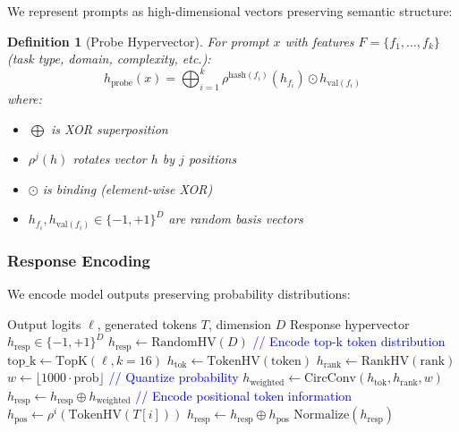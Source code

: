 \documentclass[11pt,a4paper]{article}
\newtheorem{definition}{Definition}
\begin{document}
We represent prompts as high-dimensional vectors preserving semantic structure:

\begin{definition}[Probe Hypervector]
For prompt $x$ with features $F = \{f_1, \ldots, f_k\}$ (task type, domain, complexity, etc.):
\begin{equation}
h_{\text{probe}}(x) = \bigoplus_{i=1}^k \rho^{\text{hash}(f_i)}(h_{f_i}) \odot h_{\text{val}(f_i)}
\end{equation}
where:
\begin{itemize}
\item $\bigoplus$ is XOR superposition
\item $\rho^j(h)$ rotates vector $h$ by $j$ positions
\item $\odot$ is binding (element-wise XOR)
\item $h_{f_i}, h_{\text{val}(f_i)} \in \{-1,+1\}^D$ are random basis vectors
\end{itemize}
\end{definition}

\subsubsection{Response Encoding}

We encode model outputs preserving probability distributions:

\begin{algorithm}
\caption{Response to Hypervector}
\label{alg:response-hv}
\begin{algorithmic}[1]
\Require Output logits $\ell$, generated tokens $T$, dimension $D$
\Ensure Response hypervector $h_{\text{resp}} \in \{-1,+1\}^D$
\State $h_{\text{resp}} \gets \text{RandomHV}(D)$
\State \textcolor{blue}{// Encode top-k token distribution}
\State $\text{top\_k} \gets \text{TopK}(\ell, k=16)$
    \State $h_{\text{tok}} \gets \text{TokenHV}(\text{token})$
    \State $h_{\text{rank}} \gets \text{RankHV}(\text{rank})$
    \State $w \gets \lfloor 1000 \cdot \text{prob} \rfloor$ \textcolor{blue}{// Quantize probability}
    \State $h_{\text{weighted}} \gets \text{CircConv}(h_{\text{tok}}, h_{\text{rank}}, w)$
    \State $h_{\text{resp}} \gets h_{\text{resp}} \oplus h_{\text{weighted}}$
\EndFor
\State \textcolor{blue}{// Encode positional token information}
    \State $h_{\text{pos}} \gets \rho^i(\text{TokenHV}(T[i]))$
    \State $h_{\text{resp}} \gets h_{\text{resp}} \oplus h_{\text{pos}}$
\EndFor
\State \Return $\text{Normalize}(h_{\text{resp}})$
\end{algorithmic}
\end{algorithm}
\end{document}
